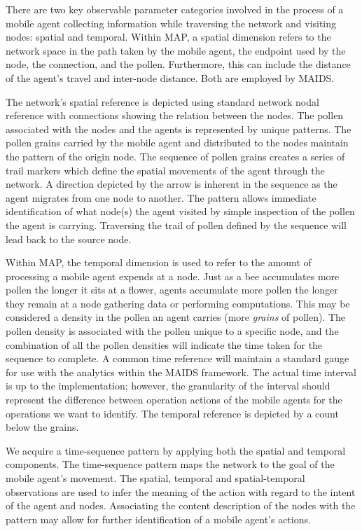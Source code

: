 \documentclass{acm_proc_article-sp}
\begin{document}
There are two key observable parameter categories involved in the process of a mobile agent collecting information while traversing the network and visiting nodes: spatial and temporal.  Within MAP, a spatial dimension refers to the network space in the path taken by the mobile agent, the endpoint used by the node, the connection, and the pollen.  Furthermore, this can include the distance of the agent's travel and inter-node distance.  Both are employed by MAIDS.

The network's spatial reference is depicted using standard network nodal reference with connections showing the relation between the nodes.  The pollen associated with the nodes and the agents is represented by unique patterns.  The pollen grains carried by the mobile agent and distributed to the nodes maintain the pattern of the origin node.  The sequence of pollen grains creates a series of trail markers which define the spatial movements of the agent through the network.  A direction depicted by the arrow is inherent in the sequence as the agent migrates from one node to another.  The pattern allows immediate identification of what node(s) the agent visited by simple inspection of the pollen the agent is carrying.  Traversing the trail of pollen defined by the sequence will lead back to the source node.

Within MAP, the temporal dimension is used to refer to the amount of processing a mobile agent expends at a node.  Just as a bee accumulates more pollen the longer it sits at a flower, agents accumulate more pollen the longer they remain at a node gathering data or performing computations.  This may be considered a density in the pollen an agent carries (more {\it grains} of pollen).  The pollen density is associated with the pollen unique to a specific node, and the combination of all the pollen densities will indicate the time taken for the sequence to complete.  A common time reference will maintain a standard gauge for use with the analytics within the MAIDS framework.  The actual time interval is up to the implementation; however, the granularity of the interval should represent the difference between operation actions of the mobile agents for the operations we want to identify.  The temporal reference is depicted by a count below the grains.

We acquire a time-sequence pattern by applying both the spatial and temporal components.  The time-sequence pattern maps the network to the goal of the mobile agent's movement.  The spatial, temporal and spatial-temporal observations are used to infer the meaning of the action with regard to the intent of the agent and nodes.  Associating the content description of the nodes with the pattern may allow for further identification of a mobile agent's actions.
\end{document}
